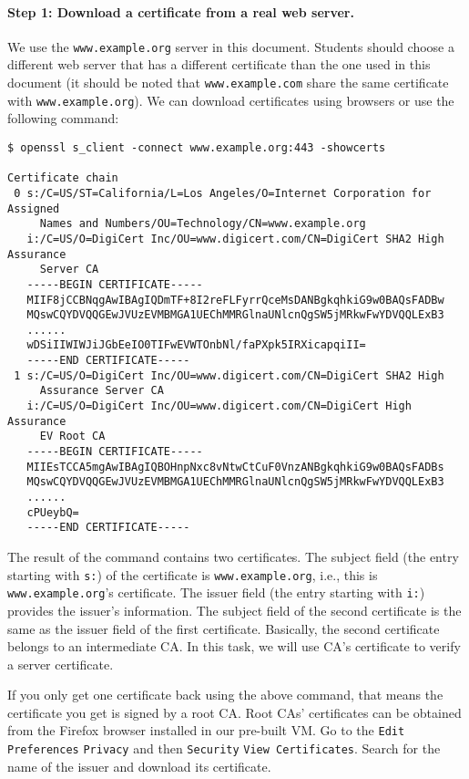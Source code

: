 \paragraph{Step 1: Download a certificate from a real web server.}
We use the \texttt{www.example.org} server in this document. Students
should choose a different web server that has a different certificate than the one used in this
document (it should be noted that \texttt{www.example.com} share the same certificate with
\texttt{www.example.org}).
We can download certificates using browsers or use the following command:

\begin{lstlisting}
$ openssl s_client -connect www.example.org:443 -showcerts

Certificate chain
 0 s:/C=US/ST=California/L=Los Angeles/O=Internet Corporation for Assigned
     Names and Numbers/OU=Technology/CN=www.example.org
   i:/C=US/O=DigiCert Inc/OU=www.digicert.com/CN=DigiCert SHA2 High Assurance
     Server CA
   -----BEGIN CERTIFICATE-----
   MIIF8jCCBNqgAwIBAgIQDmTF+8I2reFLFyrrQceMsDANBgkqhkiG9w0BAQsFADBw
   MQswCQYDVQQGEwJVUzEVMBMGA1UEChMMRGlnaUNlcnQgSW5jMRkwFwYDVQQLExB3
   ......
   wDSiIIWIWJiJGbEeIO0TIFwEVWTOnbNl/faPXpk5IRXicapqiII=
   -----END CERTIFICATE-----
 1 s:/C=US/O=DigiCert Inc/OU=www.digicert.com/CN=DigiCert SHA2 High
     Assurance Server CA
   i:/C=US/O=DigiCert Inc/OU=www.digicert.com/CN=DigiCert High Assurance
     EV Root CA
   -----BEGIN CERTIFICATE-----
   MIIEsTCCA5mgAwIBAgIQBOHnpNxc8vNtwCtCuF0VnzANBgkqhkiG9w0BAQsFADBs
   MQswCQYDVQQGEwJVUzEVMBMGA1UEChMMRGlnaUNlcnQgSW5jMRkwFwYDVQQLExB3
   ......
   cPUeybQ=
   -----END CERTIFICATE-----
\end{lstlisting}

The result of the command contains two certificates. The subject field (the entry starting with
\texttt{s:})  of the certificate is \texttt{www.example.org}, i.e.,
this is \texttt{www.example.org}'s certificate. The issuer field (the entry starting with
\texttt{i:}) provides the issuer's information. The subject field of the second certificate
is the same as the issuer field of the first certificate. Basically, the second certificate
belongs to an intermediate CA. In this task, we will use CA's certificate to
verify a server certificate.

If you only get one certificate back using the above command, that means the certificate you
get is signed by a root CA. Root CAs' certificates can be obtained from the Firefox browser
installed in our pre-built VM.  Go to the \texttt{Edit}  \texttt{Preferences}
 \texttt{Privacy}  and then \texttt{Security}  \texttt{View Certificates}.
Search for the name of the issuer and download its certificate.

